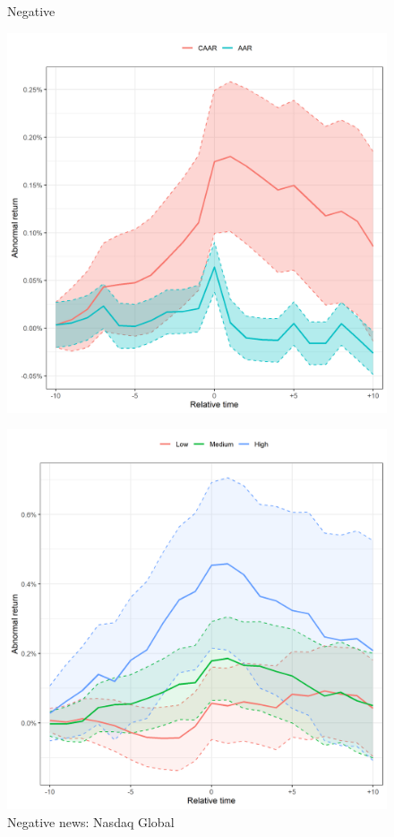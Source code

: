 \begin{figure}
     \centering
     \begin{minipage}[b]{0.49\textwidth}
         \centering
    \caption{Negative}
    \includegraphics[width=\textwidth]{Projekt/1.Figures analysis/ST_positive_all_CI_nasdaq.png}
     \label{fig:ST_neg_sensitivity_nasdaq}
     \end{minipage}
     \hfill
     \begin{minipage}[b]{0.49\textwidth}
       \centering
    \caption{Negative news: Nasdaq Global}
    \includegraphics[width=\textwidth]{Projekt/1.Figures analysis/ST_positive_ESG_nasdaq.png}

\end{minipage}
\end{figure}
